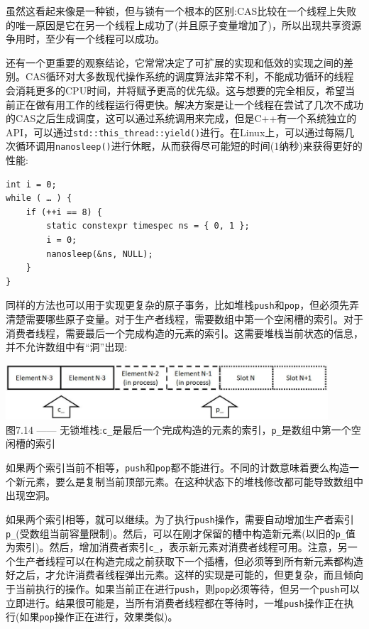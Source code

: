 虽然这看起来像是一种锁，但与锁有一个根本的区别:CAS比较在一个线程上失败的唯一原因是它在另一个线程上成功了(并且原子变量增加了)，所以出现共享资源争用时，至少有一个线程可以成功。

还有一个更重要的观察结论，它常常决定了可扩展的实现和低效的实现之间的差别。CAS循环对大多数现代操作系统的调度算法非常不利，不能成功循环的线程会消耗更多的CPU时间，并将赋予更高的优先级。这与想要的完全相反，希望当前正在做有用工作的线程运行得更快。解决方案是让一个线程在尝试了几次不成功的CAS之后生成调度，这可以通过系统调用来完成，但是C++有一个系统独立的API，可以通过\texttt{std::this\_thread::yield()}进行。在Linux上，可以通过每隔几次循环调用\texttt{nanosleep()}进行休眠，从而获得尽可能短的时间(1纳秒)来获得更好的性能:

\begin{lstlisting}[style=styleCXX]
int i = 0;
while ( … ) {
	if (++i == 8) {
		static constexpr timespec ns = { 0, 1 };
		i = 0;
		nanosleep(&ns, NULL);
	}
}
\end{lstlisting}

同样的方法也可以用于实现更复杂的原子事务，比如堆栈\texttt{push}和\texttt{pop}，但必须先弄清楚需要哪些原子变量。对于生产者线程，需要数组中第一个空闲槽的索引。对于消费者线程，需要最后一个完成构造的元素的索引。这需要堆栈当前状态的信息，并不允许数组中有“洞”出现:

\begin{center}
\includegraphics[width=0.9\textwidth]{content/2/chapter7/images/14.jpg}\\ 
图7.14 —— 无锁堆栈:\texttt{c\_}是最后一个完成构造的元素的索引，\texttt{p\_}是数组中第一个空闲槽的索引
\end{center}

如果两个索引当前不相等，\texttt{push}和\texttt{pop}都不能进行。不同的计数意味着要么构造一个新元素，要么是复制当前顶部元素。在这种状态下的堆栈修改都可能导致数组中出现空洞。

如果两个索引相等，就可以继续。为了执行\texttt{push}操作，需要自动增加生产者索引\texttt{p\_}(受数组当前容量限制)。然后，可以在刚才保留的槽中构造新元素(以旧的\texttt{p\_}值为索引)。然后，增加消费者索引\texttt{c\_}，表示新元素对消费者线程可用。注意，另一个生产者线程可以在构造完成之前获取下一个插槽，但必须等到所有新元素都构造好之后，才允许消费者线程弹出元素。这样的实现是可能的，但更复杂，而且倾向于当前执行的操作。如果当前正在进行\texttt{push}，则\texttt{pop}必须等待，但另一个\texttt{push}可以立即进行。结果很可能是，当所有消费者线程都在等待时，一堆\texttt{push}操作正在执行(如果\texttt{pop}操作正在进行，效果类似)。

